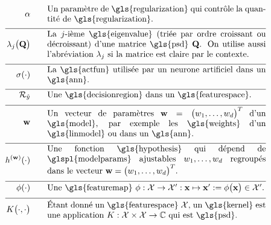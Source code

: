 \begin{align}
	\regparam \quad\quad &\parbox{.75\textwidth}{Un paramètre de \gls{regularization} qui contrôle la quantité de \gls{regularization}.} \nonumber \\[2mm] \hline \nonumber\\[-5mm]
	\eigval{\featureidx}\big( \mathbf{Q} \big) \quad\quad &\parbox{.75\textwidth}{La $\featureidx$-ième \gls{eigenvalue} (triée par ordre croissant ou décroissant) d’une matrice \gls{psd} $\mathbf{Q}$. On utilise aussi l’abréviation $\eigval{\featureidx}$ si la matrice est claire par le contexte.} \nonumber \\[2mm] \hline \nonumber\\[-5mm]
	\actfun(\cdot) \quad\quad &\parbox{.75\textwidth}{La \gls{actfun} utilisée par un neurone artificiel dans un \gls{ann}.} \nonumber \\[2mm] \hline \nonumber\\[-5mm]
	\decreg{\hat{\truelabel}} \quad\quad &\parbox{.75\textwidth}{Une \gls{decisionregion} dans un \gls{featurespace}.} \nonumber \\[2mm] \hline \nonumber\\[-5mm]  
	\weights  \quad\quad & \parbox{.75\textwidth}{Un vecteur de paramètres $\weights = \big(\weight_{1},\ldots,\weight_{\featuredim}\big)^{T}$ d’un \gls{model}, par exemple les \gls{weights} d’un \gls{linmodel} ou dans un \gls{ann}.} \nonumber \\[2mm] \hline \nonumber\\[-5mm]
	\hypothesis^{(\weights)}(\cdot)  \quad\quad &\parbox{.75\textwidth}{Une fonction \gls{hypothesis} qui dépend de \glspl{modelparams} ajustables $\weight_{1},\ldots,\weight_{\featuredim}$ regroupés dans le vecteur $\weights=\big(\weight_{1},\ldots,\weight_{\featuredim} \big)^{T}$.} \nonumber \\[2mm] \hline \nonumber\\[-5mm]
	\featuremap(\cdot)  \quad\quad & \parbox{.75\textwidth}{Une \gls{featuremap} $\featuremap: \featurespace \rightarrow \featurespace' : \featurevec \mapsto \featurevec' \defeq \featuremap\big( \featurevec \big) \in \featurespace'$.} \nonumber \\[2mm] \hline \nonumber\\[-5mm]
	\kernelmap{\cdot}{\cdot} \quad\quad & \parbox{.75\textwidth}{Étant donné un \gls{featurespace} $\featurespace$, un \gls{kernel} est une application $\kernel: \featurespace \times \featurespace \rightarrow \mathbb{C}$ qui est \gls{psd}.} \nonumber                                                                                                                                               
\end{align}
            







